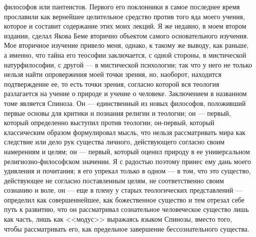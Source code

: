 \documentclass[12pt]{article}
\begin{document}
философов или пантеистов. Первого его поклонники в самое последнее время прославили как вернейшее целительное средство против того яда моего учения, которое и составит содержание этих моих лекций. Я же недавно, в моем втором издании, сделал Якова Беме вторично объектом самого основательного изучения. Мое вторичное изучение привело меня, однако, к такому же выводу, как раньше, а именно, что тайна его теософии заключается, с одной стороны, в мистической натурфилософии, с другой --- в мистической психологии; так что у него не только нельзя найти опровержения моей точки зрения, но, наоборот, находится подтверждение ее, то есть точки зрения, согласно которой вся теология разлагается на учение о природе и учение о человеке. Заключением в названном томе является Спиноза. Он --- единственный из новых философов, положивший первые основы для критики и познания религии и теологии; он --- первый, который определенно выступил против теологии; он-первый, который классическим образом формулировал мысль, что нельзя рассматривать мира как следствие или дело рук существа личного, действующего согласно своим намерениям и целям; он --- первый, который оценил природу в ее универсальном религиозно-философском значении. Я с радостью поэтому принес ему дань моего удивления и почитания; я его упрекал только в одном --- в том, что это существо, действующее не согласно поставленным целям, не соответственно своим сознанию и воле, он --- еще в плену у старых теологических представлений --- определил как совершеннейшее, как божественное существо и тем отрезал себе путь к развитию, что он рассматривал сознательное человеческое существо лишь как часть, лишь как <<модус>>  выражаясь языком Спинозы, вместо того, чтобы рассматривать его, как предельное завершение бессознательного существа. 
\end{document}
